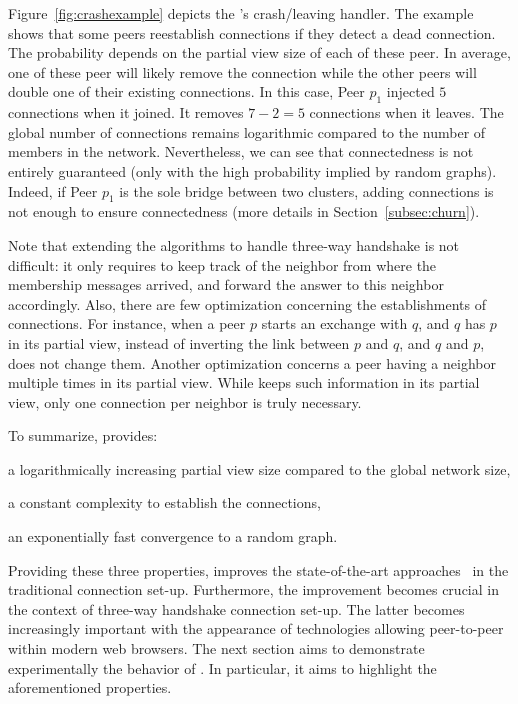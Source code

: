 Figure~\ref{fig:crashexample} depicts the \SCAMPLON{}'s crash/leaving
handler. The example shows that some peers reestablish connections if they
detect a dead connection. The probability depends on the partial view size of
each of these peer. In average, one of these peer will likely remove the
connection while the other peers will double one of their existing
connections. In this case, Peer $p_1$ injected $5$ connections when it
joined. It removes $7-2 =5 $ connections when it leaves. The global number of
connections remains logarithmic compared to the number of members in the
network. Nevertheless, we can see that connectedness is not entirely guaranteed
(only with the high probability implied by random graphs). Indeed, if Peer
$p_1$ is the sole bridge between two clusters, adding connections is not enough
to ensure connectedness (more details in Section~\ref{subsec:churn}).

Note that extending the algorithms to handle three-way handshake is not
difficult: it only requires to keep track of the neighbor from where the
membership messages arrived, and forward the answer to this neighbor
accordingly. Also, there are few optimization concerning the establishments of
connections. For instance, when a peer $p$ starts an exchange with $q$, and $q$
has $p$ in its partial view, instead of inverting the link between $p$ and $q$,
and $q$ and $p$, \SCAMPLON{} does not change them. Another optimization
concerns a peer having a neighbor multiple times in its partial view. While
\SCAMPLON{} keeps such information in its partial view, only one connection per
neighbor is truly necessary.

To summarize, \SCAMPLON{} provides:
\begin{inparaenum}[(i)]
\item a logarithmically increasing partial view size compared to the global
  network size,
\item a constant complexity to establish the connections,
\item an exponentially fast convergence to a random graph.
\end{inparaenum}
Providing these three properties, \SCAMPLON{} improves the state-of-the-art
approaches~\cite{ganesh2001scamp,voulgaris2005cyclon} in the traditional
connection set-up. Furthermore, the improvement becomes crucial in the context
of three-way handshake connection set-up.  The latter becomes increasingly
important with the appearance of technologies allowing peer-to-peer within
modern web browsers.  The next section aims to demonstrate experimentally the
behavior of \SCAMPLON{}. In particular, it aims to highlight the aforementioned
properties.


